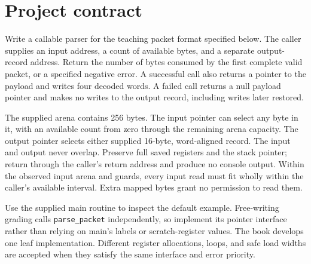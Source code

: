 \section*{Project contract}
Write a callable parser for the teaching packet format specified below. The caller
supplies an input address, a count of available bytes, and a separate output-record
address. Return the number of bytes consumed by the first complete valid packet,
or a specified negative error. A successful call also returns a pointer to the
payload and writes four decoded words. A failed call returns a null payload pointer
and makes no writes to the output record, including writes later restored.

The supplied arena contains 256 bytes. The input pointer can select any byte in
it, with an available count from zero through the remaining arena capacity. The
output pointer selects either supplied 16-byte, word-aligned record. The input and
output never overlap. Preserve full saved registers and the stack pointer; return
through the caller's return address and produce no console output. Within the
observed input arena and guards, every input read must fit wholly within the
caller's available interval. Extra mapped bytes grant no permission to read them.

Use the supplied main routine to inspect the default example. Free-writing grading
calls \texttt{parse\_packet} independently, so implement its pointer interface rather
than relying on main's labels or scratch-register values. The book develops one
leaf implementation. Different register allocations, loops, and safe load widths
are accepted when they satisfy the same interface and error priority.
